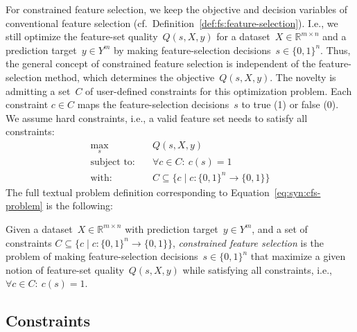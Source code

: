 For constrained feature selection, we keep the objective and decision variables of conventional feature selection (cf.~Definition~\ref{def:fs:feature-selection}).
I.e., we still optimize the feature-set quality~$Q(s,X,y)$ for a dataset~$X \in \mathbb{R}^{m \times n}$ and a prediction target~$y \in Y^m$ by making feature-selection decisions~$s \in \{0, 1\}^n$.
Thus, the general concept of constrained feature selection is independent of the feature-selection method, which determines the objective~$Q(s,X,y)$.
The novelty is admitting a set~$C$ of user-defined constraints for this optimization problem.
Each constraint $c \in C$ maps the feature-selection decisions~$s$ to true (1) or false (0).
We assume hard constraints, i.e., a valid feature set needs to satisfy all constraints:
%
\begin{equation}
	\begin{aligned}
		\max_s &\quad Q(s,X,y) \\
		\text{subject to:} &\quad \forall c \in C:~ c(s) = 1 \\
		\text{with:} &\quad C \subseteq \{c \mid c: \{0,1\}^n \to \{0, 1\}\}
	\end{aligned}
	\label{eq:syn:cfs-problem}
\end{equation}
%
The full textual problem definition corresponding to Equation~\ref{eq:syn:cfs-problem} is the following:
%
\begin{definition}
	Given a dataset~$X \in \mathbb{R}^{m \times n}$ with prediction target~$y \in Y^m$, and a set of constraints $C \subseteq \{c \mid c: \{0,1\}^n \to \{0, 1\}\}$,
	\emph{constrained feature selection} is the problem of making feature-selection decisions~$s \in \{0,1\}^n$ that maximize a given notion of feature-set quality~$Q(s,X,y)$ while satisfying all constraints, i.e., ${\forall c \in C:}~ c(s) = 1$.
	\label{def:syn:constrained-feature-selection}
\end{definition}

\subsection{Constraints}
\label{sec:syn:approach:constraints}

